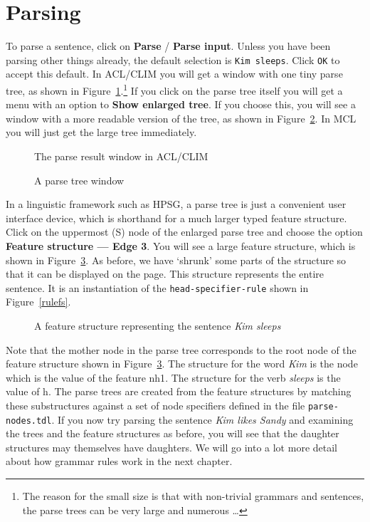 \documentclass[12pt]{report}
\newcommand{\filename}[1]{{\tt #1}}
\newcommand{\lkbentryname}[1]{{\tt #1}}
\newcommand{\lkbmenucommand}{\bf}
\begin{document}
\section{Parsing}

To parse a sentence, click on {\lkbmenucommand Parse} / {\lkbmenucommand Parse input}.  
Unless you have been parsing other things already,
the default selection is {\tt Kim sleeps}.  Click {\tt OK} to
accept this default.  In ACL/CLIM
you will get a window with one tiny parse
tree, as shown in Figure~\ref{kimsleeps}.\footnote{The reason for the
small size is that with non-trivial grammars and sentences, the parse 
trees can be very large and numerous \ldots} If you click on the parse
tree itself you will get a menu with an option to {\lkbmenucommand Show enlarged tree}.
If you choose this, you will see a window with a more readable version
of the tree, as shown in Figure~\ref{ptree}. In MCL you will just get the 
large tree immediately.
\begin{figure}
\epsfxsize=2in
\caption{The parse result window in ACL/CLIM}
\label{kimsleeps}
\end{figure}
\begin{figure}
\epsfxsize=2in
\caption{A parse tree window}
\label{ptree}
\end{figure}

In a linguistic framework such as HPSG, a parse tree is just a convenient
user interface device, which is shorthand for a much larger typed
feature structure.  Click on the uppermost (S) node of the
enlarged parse tree and choose the option 
{\lkbmenucommand Feature structure --- Edge 3}.  
You will
see a large feature structure, which is shown in Figure~\ref{bigfs}.
As before, we have `shrunk' some parts of the structure so that
it can be displayed on the page.
This structure represents the entire
sentence.  It is an instantiation of the \lkbentryname{head-specifier-rule}
shown in Figure~\ref{rulefs}.
\begin{figure}
\epsfxsize=4in
\caption{A feature structure representing the sentence {\it Kim sleeps}}
\label{bigfs}
\end{figure}

Note that the mother node in the parse tree corresponds
to the root node of the feature structure shown in Figure~\ref{bigfs}.
The structure for the word {\it Kim} is the node which
is the value of the feature {\feature nh1}.  The structure for the
verb {\it sleeps} is the value of {\feature h}.
The parse trees are created from the feature structures
by matching these substructures against a set of node specifiers
defined in the file \filename{parse-nodes.tdl}.
If you now try parsing the sentence {\it Kim likes Sandy}
and examining the trees and the feature structures as before, you
will see that the daughter structures may themselves have daughters.
We will go into a lot more detail about how grammar rules work
in the next chapter.
\end{document}
